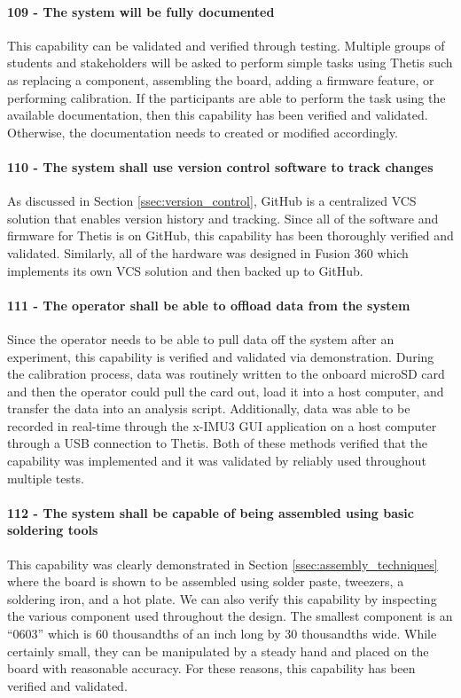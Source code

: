 \paragraph*{109 - The system will be fully documented} This capability can be validated and verified through testing.
Multiple groups of students and stakeholders will be asked to perform simple tasks using Thetis such as replacing a component, assembling the board, adding a firmware feature, or performing calibration.
If the participants are able to perform the task using the available documentation, then this capability has been verified and validated.
Otherwise, the documentation needs to created or modified accordingly.

\paragraph*{110 - The system shall use version control software to track changes} As discussed in Section \ref{ssec:version_control}, GitHub is a centralized VCS solution that enables version history and tracking.
Since all of the software and firmware for Thetis is on GitHub, this capability has been thoroughly verified and validated.
Similarly, all of the hardware was designed in Fusion 360 which implements its own VCS solution and then backed up to GitHub.

\paragraph*{111 - The operator shall be able to offload data from the system} Since the operator needs to be able to pull data off the system after an experiment, this capability is verified and validated via demonstration.
During the calibration process, data was routinely written to the onboard microSD card and then the operator could pull the card out, load it into a host computer, and transfer the data into an analysis script.
Additionally, data was able to be recorded in real-time through the x-IMU3 GUI application on a host computer through a USB connection to Thetis.
Both of these methods verified that the capability was implemented and it was validated by reliably used throughout multiple tests.

\paragraph*{112 - The system shall be capable of being assembled using basic soldering tools} This capability was clearly demonstrated in Section \ref{ssec:assembly_techniques} where the board is shown to be assembled using solder paste, tweezers, a soldering iron, and a hot plate.
We can also verify this capability by inspecting the various component used throughout the design.
The smallest component is an ``0603'' which is 60 thousandths of an inch long by 30 thousandths wide.
While certainly small, they can be manipulated by a steady hand and placed on the board with reasonable accuracy.
For these reasons, this capability has been verified and validated.

